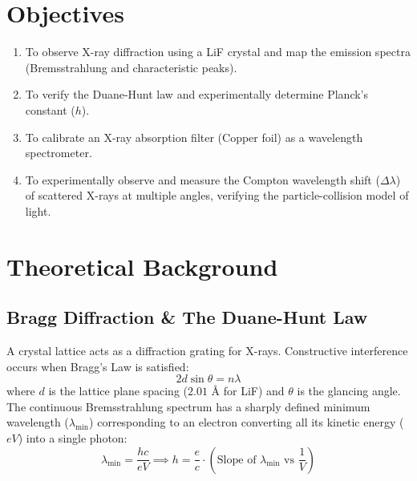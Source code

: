 \documentclass[a4paper,11pt]{article}
\begin{document}
\section{Objectives}
\begin{enumerate}
    \item To observe X-ray diffraction using a LiF crystal and map the emission spectra (Bremsstrahlung and characteristic peaks).
    \item To verify the Duane-Hunt law and experimentally determine Planck's constant ($h$).
    \item To calibrate an X-ray absorption filter (Copper foil) as a wavelength spectrometer.
    \item To experimentally observe and measure the Compton wavelength shift ($\Delta\lambda$) of scattered X-rays at multiple angles, verifying the particle-collision model of light.
\end{enumerate}

\section{Theoretical Background}

\subsection{Bragg Diffraction \& The Duane-Hunt Law}
A crystal lattice acts as a diffraction grating for X-rays. Constructive interference occurs when Bragg's Law is satisfied:
\begin{equation}
    2d \sin\theta = n\lambda
\end{equation}
where $d$ is the lattice plane spacing ($2.01\text{ \AA}$ for LiF) and $\theta$ is the glancing angle.
The continuous Bremsstrahlung spectrum has a sharply defined minimum wavelength ($\lambda_{\text{min}}$) corresponding to an electron converting all its kinetic energy ($eV$) into a single photon:
\begin{equation}
    \lambda_{\text{min}} = \frac{hc}{eV} \implies h = \frac{e}{c} \cdot \left( \text{Slope of } \lambda_{\text{min}} \text{ vs } \frac{1}{V} \right)
\end{equation}
\end{document}
